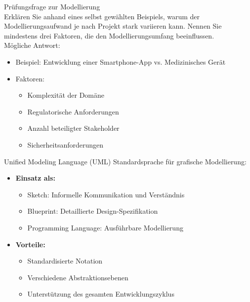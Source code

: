 \begin{example2}{Prüfungsfrage zur Modellierung}\\
Erklären Sie anhand eines selbst gewählten Beispiels, warum der Modellierungsaufwand je nach Projekt stark variieren kann. Nennen Sie mindestens drei Faktoren, die den Modellierungsumfang beeinflussen.
\vspace{3mm}\\
Mögliche Antwort:
\begin{itemize}
    \item Beispiel: Entwicklung einer Smartphone-App vs. Medizinisches Gerät
    \item Faktoren:
    \begin{itemize}
        \item Komplexität der Domäne
        \item Regulatorische Anforderungen
        \item Anzahl beteiligter Stakeholder
        \item Sicherheitsanforderungen
    \end{itemize}
\end{itemize}
\end{example2}

\begin{definition}{Unified Modeling Language (UML)}
Standardsprache für grafische Modellierung:
\begin{itemize}
    \item \textbf{Einsatz als:}
    \begin{itemize}
        \item Sketch: Informelle Kommunikation und Verständnis
        \item Blueprint: Detaillierte Design-Spezifikation
        \item Programming Language: Ausführbare Modellierung
    \end{itemize}
    \item \textbf{Vorteile:}
    \begin{itemize}
        \item Standardisierte Notation
        \item Verschiedene Abstraktionsebenen
        \item Unterstützung des gesamten Entwicklungszyklus
    \end{itemize}
\end{itemize}
\end{definition}

